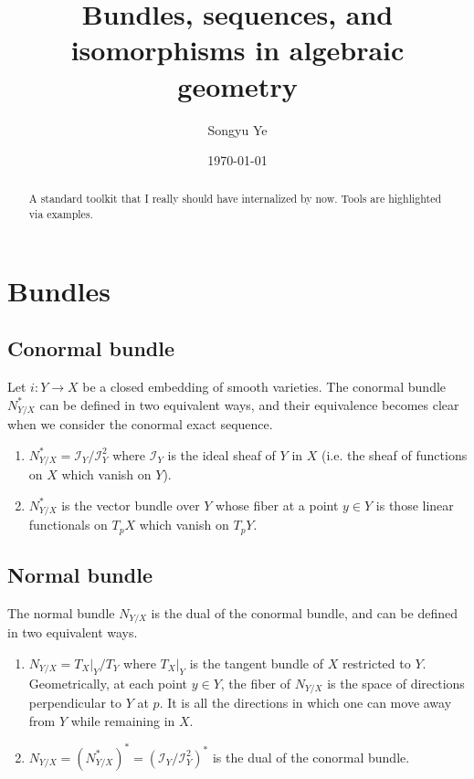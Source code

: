\documentclass[12pt]{article}
\begin{document}
\rhead{\today}
\cfoot{\thepage}

\title{Bundles, sequences, and isomorphisms in algebraic geometry}

\author{Songyu Ye}
\date{\today}
\maketitle


\begin{abstract}
A standard toolkit that I really should have internalized by now. Tools are highlighted via examples.
\end{abstract}

\tableofcontents

\section{Bundles}
\subsection{Conormal bundle}
Let $i: Y \to X$ be a closed embedding of smooth varieties. The conormal bundle $N^*_{Y/X}$ can be defined in two equivalent ways, and their equivalence becomes clear when we consider the conormal exact sequence.

\begin{enumerate}
    \item $N^*_{Y/X} = \mathcal{I}_Y/\mathcal{I}_Y^2$ where $\mathcal{I}_Y$ is the ideal sheaf of $Y$ in $X$ (i.e. the sheaf of functions on $X$ which vanish on $Y$).
    \item $N^*_{Y/X}$ is the vector bundle over $Y$ whose fiber at a point $y\in Y$ is those linear functionals on $T_pX$ which vanish on $T_pY$.
\end{enumerate}

\subsection{Normal bundle}
The normal bundle $N_{Y/X}$ is the dual of the conormal bundle, and can be defined in two equivalent ways.
\begin{enumerate}
    \item $N_{Y/X} = T_X\vert_Y / T_Y$ where $T_X\vert_Y$ is the tangent bundle of $X$ restricted to $Y$. Geometrically, at each point $y\in Y$, the fiber of $N_{Y/X}$ is the space of directions perpendicular to $Y$ at $p$. It is all the directions in which one can move away from $Y$ while remaining in $X$.
    \item $N_{Y/X} = (N^*_{Y/X})^* = (\mathcal{I}_Y/\mathcal{I}_Y^2)^*$ is the dual of the conormal bundle.
    \end{enumerate}
\end{document}
